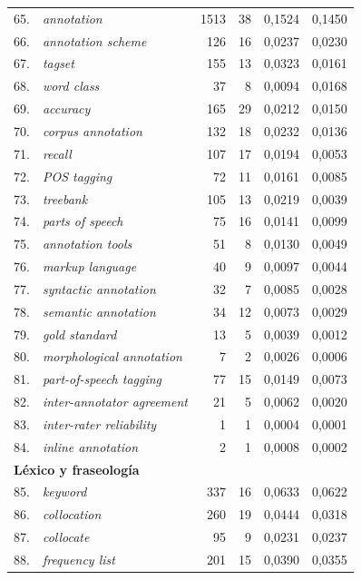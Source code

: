 \begin{longtable}{@{} r p{5cm} r r r r @{}}
\midrule
65. & \textit{annotation} & 1513 & 38 & 0{,}1524 & 0{,}1450 \\
66. & \textit{annotation scheme} & 126 & 16 & 0{,}0237 & 0{,}0230 \\
67. & \textit{tagset} & 155 & 13 & 0{,}0323 & 0{,}0161 \\
68. & \textit{word class} & 37 & 8 & 0{,}0094 & 0{,}0168 \\
69. & \textit{accuracy} & 165 & 29 & 0{,}0212 & 0{,}0150 \\
70. & \textit{corpus annotation} & 132 & 18 & 0{,}0232 & 0{,}0136 \\
71. & \textit{recall} & 107 & 17 & 0{,}0194 & 0{,}0053 \\
72. & \textit{POS tagging} & 72 & 11 & 0{,}0161 & 0{,}0085 \\
73. & \textit{treebank} & 105 & 13 & 0{,}0219 & 0{,}0039 \\
74. & \textit{parts of speech} & 75 & 16 & 0{,}0141 & 0{,}0099 \\
75. & \textit{annotation tools} & 51 & 8 & 0{,}0130 & 0{,}0049 \\
76. & \textit{markup language} & 40 & 9 & 0{,}0097 & 0{,}0044 \\
77. & \textit{syntactic annotation} & 32 & 7 & 0{,}0085 & 0{,}0028 \\
78. & \textit{semantic annotation} & 34 & 12 & 0{,}0073 & 0{,}0029 \\
79. & \textit{gold standard} & 13 & 5 & 0{,}0039 & 0{,}0012 \\
80. & \textit{morphological annotation} & 7 & 2 & 0{,}0026 & 0{,}0006 \\
81. & \textit{part-of-speech tagging} & 77 & 15 & 0{,}0149 & 0{,}0073 \\
82. & \textit{inter-annotator agreement} & 21 & 5 & 0{,}0062 & 0{,}0020 \\
83. & \textit{inter-rater reliability} & 1 & 1 & 0{,}0004 & 0{,}0001 \\
84. & \textit{inline annotation} & 2 & 1 & 0{,}0008 & 0{,}0002 \\
\midrule
\multicolumn{6}{l}{\textbf{Léxico y fraseología}} \\
\midrule
85. & \textit{keyword} & 337 & 16 & 0{,}0633 & 0{,}0622 \\
86. & \textit{collocation} & 260 & 19 & 0{,}0444 & 0{,}0318 \\
87. & \textit{collocate} & 95 & 9 & 0{,}0231 & 0{,}0237 \\
88. & \textit{frequency list} & 201 & 15 & 0{,}0390 & 0{,}0355 \\

\end{longtable}
